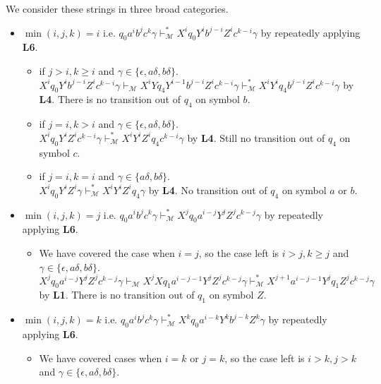 \documentclass[12pt]{article}
\begin{document}
\begin{itemize}
  We consider these strings in three broad categories.
  \begin{itemize}
    \item \(\min(i, j, k) = i\) i.e. \(q_0a^ib^jc^k\gamma \vdash^*_\mathcal{M} X^iq_0Y^ib^{j-i}Z^ic^{k-i}\gamma\) by repeatedly applying \textbf{L6}.
    \begin{itemize}
      \item if \(j > i, k \geq i\) and \(\gamma \in \{\epsilon, a\delta, b\delta\}\).\\ \(X^iq_0Y^ib^{j-i}Z^ic^{k-i}\gamma \vdash_\mathcal{M} X^iYq_4Y^{i-1}b^{j-i}Z^ic^{k-i}\gamma \vdash^*_\mathcal{M} X^iY^iq_4b^{j-i}Z^ic^{k-i}\gamma\) by \textbf{L4}. There is no transition out of \(q_4\) on symbol \(b\).
      \item if \(j = i, k > i\) and \(\gamma \in \{\epsilon, a\delta, b\delta\}\).\\
      \(X^iq_0Y^iZ^ic^{k-i}\gamma \vdash^*_\mathcal{M} X^iY^iZ^iq_4c^{k-i}\gamma\) by \textbf{L4}. Still no transition out of \(q_4\) on symbol \(c\).
      \item if \(j = i, k = i\) and \(\gamma \in \{a\delta, b\delta\}\).\\
      \(X^iq_0Y^iZ^i\gamma \vdash^*_\mathcal{M} X^iY^iZ^iq_4\gamma\) by \textbf{L4}. No transition out of \(q_4\) on symbol \(a\) or \(b\).
    \end{itemize}
    \item \(\min(i, j, k) = j\) i.e. \(q_0a^ib^jc^k\gamma \vdash^*_\mathcal{M} X^jq_0a^{i-j}Y^jZ^jc^{k-j}\gamma\) by repeatedly applying \textbf{L6}.
    \begin{itemize}
      \item We have covered the case when \(i =j\), so the case left is \(i > j, k \geq j\) and \(\gamma \in \{\epsilon, a\delta, b\delta\}\).\\ \(X^jq_0a^{i-j}Y^jZ^jc^{k-j}\gamma \vdash_\mathcal{M} X^jXq_1a^{i-j-1}Y^jZ^jc^{k-j}\gamma \vdash^*_\mathcal{M} X^{j+1}a^{i-j-1}Y^jq_1Z^jc^{k-j}\gamma\) by \textbf{L1}. There is no transition out of \(q_1\) on symbol \(Z\).
    \end{itemize}
    \item \(\min(i, j, k) = k\) i.e. \(q_0a^ib^jc^k\gamma \vdash^*_\mathcal{M} X^kq_0a^{i-k}Y^kb^{j-k}Z^k\gamma\) by repeatedly applying \textbf{L6}.
    \begin{itemize}
      \item We have covered cases when \(i = k\) or \(j = k\), so the case left is \(i > k, j > k\) and \(\gamma \in \{\epsilon, a\delta, b\delta\}\).\\

\end{itemize}
\end{itemize}
\end{itemize}
\end{document}
